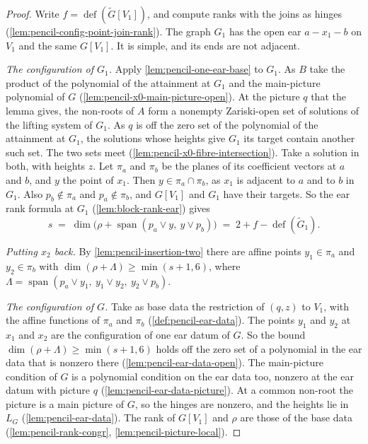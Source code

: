 \begin{proof}
  \leanok
  Write $f = \operatorname{def}(\tilde G[V_1])$, and compute ranks with the
  joins as hinges (\cref{lem:pencil-config-point-join-rank}). The graph
  $G_1$ has the open ear $a - x_1 - b$ on $V_1$ and the same $G[V_1]$. It
  is simple, and its ends are not adjacent.

  \emph{The configuration of $G_1$.} Apply \cref{lem:pencil-one-ear-base}
  to $G_1$. As $B$ take the product of the polynomial of the attainment at
  $G_1$ and the main-picture polynomial of $G$
  (\cref{lem:pencil-x0-main-picture-open}). At the picture $q$ that the
  lemma gives, the non-roots of $A$ form a nonempty Zariski-open set of
  solutions of the lifting system of $G_1$. As $q$ is off the zero set of
  the polynomial of the attainment at $G_1$, the solutions whose heights
  give $G_1$ its target contain another such set. The two sets meet
  (\cref{lem:pencil-x0-fibre-intersection}). Take a solution in both, with
  heights $z$. Let $\pi_a$ and $\pi_b$ be the planes of its coefficient
  vectors at $a$ and $b$, and $y$ the point of $x_1$. Then
  $y \in \pi_a \cap \pi_b$, as $x_1$ is adjacent to $a$ and to $b$ in
  $G_1$. Also $p_b \notin \pi_a$ and $p_a \notin \pi_b$, and $G[V_1]$ and
  $G_1$ have their targets. So the ear rank formula at $G_1$
  (\cref{lem:block-rank-ear}) gives
  \[
    s \;=\; \dim\bigl(\rho + \operatorname{span}(p_a \vee y,\ y \vee
    p_b)\bigr) \;=\; 2 + f - \operatorname{def}(\tilde G_1).
  \]

  \emph{Putting $x_2$ back.} By \cref{lem:pencil-insertion-two} there are
  affine points $y_1 \in \pi_a$ and $y_2 \in \pi_b$ with
  $\dim(\rho + \Lambda) \ge \min(s + 1, 6)$, where
  $\Lambda = \operatorname{span}(p_a \vee y_1,\ y_1 \vee y_2,\
  y_2 \vee p_b)$.

  \emph{The configuration of $G$.} Take as base data the restriction of
  $(q, z)$ to $V_1$, with the affine functions of $\pi_a$ and $\pi_b$
  (\cref{def:pencil-ear-data}). The points $y_1$ and $y_2$ at $x_1$ and
  $x_2$ are the configuration of one ear datum of $G$. So the bound
  $\dim(\rho + \Lambda) \ge \min(s + 1, 6)$ holds off the zero set of a
  polynomial in the ear data that is nonzero there
  (\cref{lem:pencil-ear-data-open}). The main-picture condition of $G$ is
  a polynomial condition on the ear data too, nonzero at the ear datum
  with picture $q$ (\cref{lem:pencil-ear-data-picture}). At a common
  non-root the picture is a main picture of $G$, so the hinges are
  nonzero, and the heights lie in $L_G$ (\cref{lem:pencil-ear-data}). The
  rank of $G[V_1]$ and $\rho$ are those of the base data
  (\cref{lem:pencil-rank-congr}, \cref{lem:pencil-picture-local}).


\end{proof}
